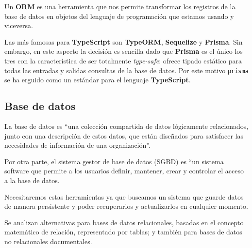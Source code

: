 Un \textbf{ORM} es una herramienta que nos permite transformar los registros de la base de datos en objetos del lenguaje de programación que estamos usando y viceversa.

Las más famosas para \textbf{TypeScript} son \textbf{TypeORM}, \textbf{Sequelize} y \textbf{Prisma}. Sin embargo, en este aspecto la decisión es sencilla dado que \textbf{Prisma} es el único los tres con la característica de ser totalmente \textit{type-safe}: ofrece tipado estático para todas las entradas y salidas consultas de la base de datos. Por este motivo \texttt{prisma} se ha erguido como un estándar para el lenguaje \textbf{TypeScript}.

\subsection{Base de datos}

La base de datos es ``una colección compartida de datos lógicamente relacionados, junto con una descripción de estos datos, que están diseñados para satisfacer las necesidades de información de una organización''\cite{alma991009264529704990}.

Por otra parte, el sistema gestor de base de datos (SGBD) es ``un sistema software que permite a los usuarios definir, mantener, crear y controlar el acceso a la base de datos\cite{alma991009264529704990}.

Necesitaremos estas herramientas ya que buscamos un sistema que guarde datos de manera persistente y poder recuperarlos y actualizarlos en cualquier momento.

Se analizan alternativas para bases de datos relacionales, basadas en el concepto matemático de relación, representado por tablas\cite{alma991009264529704990}; y también para bases de datos no relacionales documentales.

